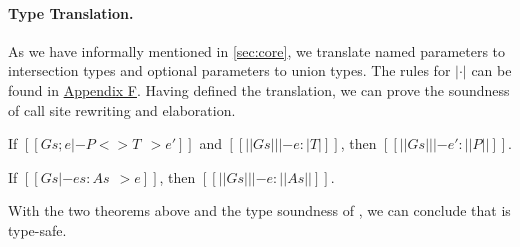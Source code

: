 \paragraph{Type Translation.}
As we have informally mentioned in \autoref{sec:core}, we translate named
parameters to intersection types and optional parameters to union types. The
rules for $|\cdot|$ can be found in \hyperref[sec:appendix-translate]{Appendix F}. Having
defined the translation, we can prove the soundness of call site rewriting and
elaboration.

\begin{theorem}
  If $[[Gs; e |- P <> T ~~> e']]$ and $[[||Gs|| |- e : |T|]]$,
  then $[[||Gs|| |- e' : ||P||]]$.
\end{theorem}

\begin{theorem}
  If $[[Gs |- es : As ~~> e]]$, then $[[||Gs|| |- e : ||As||]]$.
\end{theorem}

\noindent
With the two theorems above and the type soundness of \lambdaiu, we can
conclude that \uaena is type-safe.
